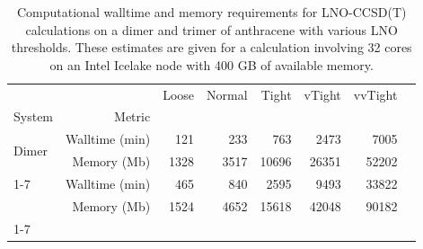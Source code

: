 \begin{table}[h]

\caption{\label{tab:anthracene_lno_costs}Computational walltime and memory requirements for LNO-CCSD(T) calculations on a dimer and trimer of anthracene with various LNO thresholds. These estimates are given for a calculation involving 32 cores on an Intel Icelake node with 400 GB of available memory.}
\begin{tabular}{lrrrrrrr}
\toprule
 &  & Loose & Normal & Tight & vTight & vvTight \\ 
System & Metric &  &  &  &  &  \\
\midrule
\multirow[c]{2}{*}{Dimer} & Walltime (min) & 121 & 233 & 763 & 2473 & 7005 \\
 & Memory (Mb) & 1328 & 3517 & 10696 & 26351 & 52202 \\
\cline{1-7}
\multirow[c]{2}{*}{Trimer} & Walltime (min) & 465 & 840 & 2595 & 9493 & 33822 \\
 & Memory (Mb) & 1524 & 4652 & 15618 & 42048 & 90182 \\
\cline{1-7}
\bottomrule
\end{tabular}

\end{table}
